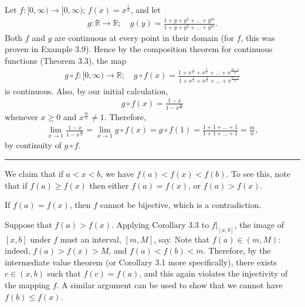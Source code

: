 \documentclass[letterpaper,10pt,english]{jupyterBook}
\begin{document}
Let \(f:[0,\infty)\to[0,\infty)\); \(f(x)=x^{\frac{1}{n}}\), and let
\begin{equation*}
\begin{split}
g:\mathbb{R}\to\mathbb{R};\hspace{1em} g(y)=\frac{1+y+y^2+\ldots+y^m}{1+y+y^2+\ldots+y^m}.
\end{split}
\end{equation*}
\sphinxAtStartPar
Both \(f\) and \(g\) are continuous at every point in their domain (for \(f\), this was proven in Example 3.9). Hence by the composition theorem for continuous functions (Theorem 3.3), the map
\begin{equation*}
\begin{split}
g\circ f:[0,\infty)\to\mathbb{R}; \hspace{1em} g\circ f(x) = \frac{1+x^{\frac{1}{n}}+x^{\frac{2}{n}}+\ldots+x^{\frac{m-1}{n}}}{1+x^{\frac{1}{n}}+x^{\frac{2}{n}}+\ldots+x^{\frac{n-1}{n}}}
\end{split}
\end{equation*}
\sphinxAtStartPar
is continuous. Also, by our initial calculation,
\begin{equation*}
\begin{split}
g\circ f(x) = \frac{1 - x}{1 - x^{\frac{m}{n}}}
\end{split}
\end{equation*}
\sphinxAtStartPar
whenever \(x\geq 0\) and \(x^{\frac{m}{n}}\neq 1\). Therefore,
\begin{equation*}
\begin{split}
\lim_{x\rightarrow 1}\frac{1 - x}{1 - x^{\frac{m}{n}}} = \lim_{x\rightarrow 1}g\circ f(x) = g\circ f(1) = \frac{1+1+\ldots+1}{1+1+\ldots+1} = \frac{m}{n},
\end{split}
\end{equation*}
\sphinxAtStartPar
by continuity of \(g\circ f\).


\bigskip\hrule\bigskip


\sphinxAtStartPar
{\hyperref[\detokenize{Problems:id34}]{}} We claim that if \(a < x < b\), we have \(f(a) < f(x) < f(b)\). To see this, note that if \(f(a) \geq f(x)\) then either \(f(a) = f(x)\), or \(f(a) > f(x)\).

If \(f(a)=f(x)\), then \(f\) cannot be bijective, which is a contradiction.

Suppose that \(f(a)>f(x)\). Applying Corollary 3.3 to \(f|_{[x,b]}\), the image of \([x,b]\) under \(f\) must an interval, \([m,M]\), say. Note that \(f(a)\in(m,M)\): indeed, \(f(a)>f(x)>M\), and \(f(a)<f(b)<m\). Therefore, by the intermediate value theorem (or Corollary 3.1 more specifically), there exists \(c \in (x, b)\) such that \(f(c) = f(a)\), and this again violates the injectivity of the mapping \(f\). A similar argument can be used to show that we cannot have \(f(b) \leq f(x)\).
\end{document}
